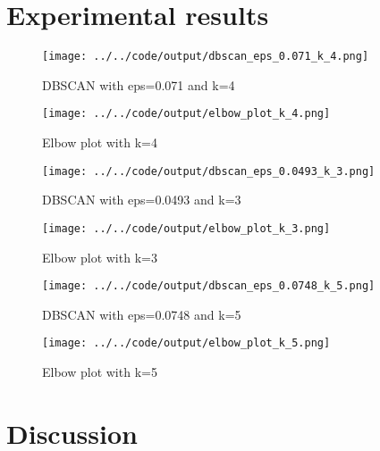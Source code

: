 \documentclass[twoside, a4paper, fleqn, reqno]{article}
\begin{document}
\section*{Experimental results}

\begin {figure}[H]
	\centering
	\texttt{[image: ../../code/output/dbscan\_eps\_0.071\_k\_4.png]}
	\caption{DBSCAN with eps=0.071 and k=4}
	\label{fig:dbscan_eps_0.071_k_4}
\end {figure}

\begin {figure}[H]
	\centering
	\texttt{[image: ../../code/output/elbow\_plot\_k\_4.png]}
	\caption{Elbow plot with k=4}
	\label{fig:elbow_plot_k_4}
\end {figure}

\begin {figure}[H]
	\centering
	\texttt{[image: ../../code/output/dbscan\_eps\_0.0493\_k\_3.png]}
	\caption{DBSCAN with eps=0.0493 and k=3}
	\label{fig:dbscan_eps_0.0493_k_3}
\end {figure}

\begin {figure}[H]
	\centering
	\texttt{[image: ../../code/output/elbow\_plot\_k\_3.png]}
	\caption{Elbow plot with k=3}
	\label{fig:elbow_plot_k_3}
\end {figure}

\begin {figure}[H]
	\centering
	\texttt{[image: ../../code/output/dbscan\_eps\_0.0748\_k\_5.png]}
	\caption{DBSCAN with eps=0.0748 and k=5}
	\label{fig:dbscan_eps_0.0748_k_5}
\end {figure}

\begin {figure}[H]
	\centering
	\texttt{[image: ../../code/output/elbow\_plot\_k\_5.png]}
	\caption{Elbow plot with k=5}
	\label{fig:elbow_plot_k_5}
\end {figure}

\section*{Discussion}
\end{document}
